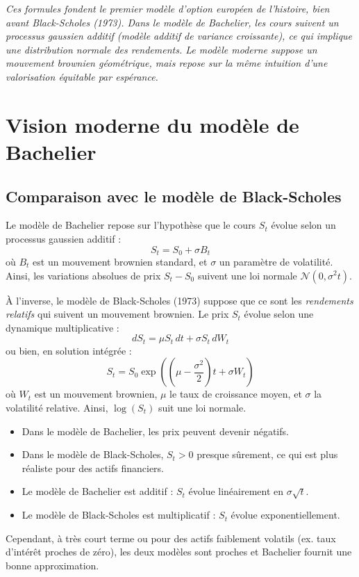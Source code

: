 \documentclass[12pt,a4paper]{article}
\begin{document}
\textit{
Ces formules fondent le premier modèle d’option européen de l’histoire, bien avant Black-Scholes (1973). Dans le modèle de Bachelier, les cours suivent un processus gaussien additif (modèle additif de variance croissante), ce qui implique une distribution normale des rendements. Le modèle moderne suppose un mouvement brownien géométrique, mais repose sur la même intuition d’une valorisation équitable par espérance.
}

\section{Vision moderne du modèle de Bachelier}

\subsection{Comparaison avec le modèle de Black-Scholes}

Le modèle de Bachelier repose sur l’hypothèse que le cours $S_t$ évolue selon un processus gaussien additif :
\[
S_t = S_0 + \sigma B_t
\]
où $B_t$ est un mouvement brownien standard, et $\sigma$ un paramètre de volatilité. Ainsi, les variations absolues de prix $S_t - S_0$ suivent une loi normale $\mathcal{N}(0, \sigma^2 t)$.

À l’inverse, le modèle de Black-Scholes (1973) suppose que ce sont les \textit{rendements relatifs} qui suivent un mouvement brownien. Le prix $S_t$ évolue selon une dynamique multiplicative :
\[
dS_t = \mu S_t\, dt + \sigma S_t\, dW_t
\]
ou bien, en solution intégrée :
\[
S_t = S_0 \exp\left( \left(\mu - \frac{\sigma^2}{2} \right)t + \sigma W_t \right)
\]
où $W_t$ est un mouvement brownien, $\mu$ le taux de croissance moyen, et $\sigma$ la volatilité relative. Ainsi, $\log(S_t)$ suit une loi normale.

\begin{itemize}
    \item Dans le modèle de Bachelier, les prix peuvent devenir négatifs.
    \item Dans le modèle de Black-Scholes, $S_t > 0$ presque sûrement, ce qui est plus réaliste pour des actifs financiers.
    \item Le modèle de Bachelier est additif : $S_t$ évolue linéairement en $\sigma \sqrt{t}$.
    \item Le modèle de Black-Scholes est multiplicatif : $S_t$ évolue exponentiellement.
\end{itemize}

Cependant, à très court terme ou pour des actifs faiblement volatils (ex. taux d'intérêt proches de zéro), les deux modèles sont proches et Bachelier fournit une bonne approximation.
\end{document}
